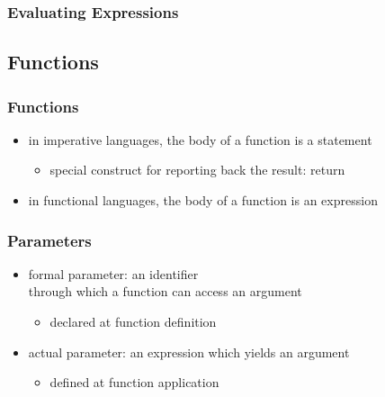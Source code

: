 \documentclass[dvipsnames]{beamer}
\theoremstyle{plain}
\begin{document}
\begin{frame}[fragile]
  \frametitle{Evaluating Expressions}

  \begin{example}

    \pause
    \medskip

    \pause
    \medskip

    \pause
    \medskip
  \end{example}
\end{frame}

\subsection{Functions}

\begin{frame}
  \frametitle{Functions}

  \begin{itemize}
    \item in imperative languages, the body of a function is a statement
    \begin{itemize}
      \item special construct for reporting back the result: \alert{return}
    \end{itemize}

    \pause
    \medskip
    \item in functional languages, the body of a function is an expression
  \end{itemize}
\end{frame}

\begin{frame}
  \frametitle{Parameters}

  \begin{itemize}
    \item \alert{formal parameter}: an identifier\\
      through which a function can access an argument
    \begin{itemize}
      \item declared at function definition
    \end{itemize}

    \pause
    \medskip
    \item \alert{actual parameter}: an expression which yields an argument
    \begin{itemize}
      \item defined at function application
    \end{itemize}
  \end{itemize}
\end{frame}
\end{document}
